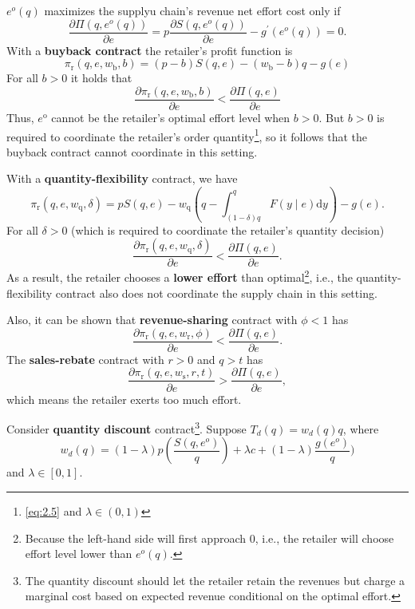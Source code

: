  $e^o(q)$ maximizes the supplyu chain's revenue net effort cost only if 
 \begin{equation}
     \frac{\partial\Pi(q,e^o(q))}{\partial e}=p\frac{\partial S(q,e^o(q))}{\partial e}-g^\prime(e^o(q))=0.
 \end{equation}
 With a \textbf{buyback contract} the retailer's profit function is
 $$
 \pi_{\mathrm{r}}\left(q, e, w_{\mathrm{b}}, b\right)=(p-b) S(q, e)-\left(w_{\mathrm{b}}-b\right) q-g(e)
 $$
 For all $b>0$ it holds that
 \begin{equation}
    \frac{\partial \pi_{\mathrm{r}}\left(q, e, w_{\mathrm{b}}, b\right)}{\partial e}<\frac{\partial \Pi(q, e)}{\partial e}
 \end{equation}
 Thus, $e^{\mathrm{o}}$ cannot be the retailer's optimal effort level when $b>0$. But $b>0$ is required to coordinate the retailer's order quantity\footnote{\autoref{eq:2.5} and $\lambda\in(0,1)$}, so it follows that the buyback contract cannot coordinate in this setting.

With a \textbf{quantity-flexibility} contract, we have 
$$
\pi_{\mathrm{r}}\left(q, e, w_{\mathrm{q}}, \delta\right)=p S(q, e)-w_{\mathrm{q}}\left(q-\int_{(1-\delta) q}^{q} F(y \mid e) \mathrm{d} y\right)-g(e) .
$$
For all $\delta>0$ (which is required to coordinate the retailer's quantity decision)
$$
\frac{\partial \pi_{\mathrm{r}}\left(q, e, w_{\mathrm{q}}, \delta\right)}{\partial e}<\frac{\partial \Pi(q, e)}{\partial e} .
$$
As a result, the retailer chooses a \textbf{lower effort} than optimal\footnote{Because the left-hand side will first approach $0$, i.e., the retailer will choose effort level lower than $e^o(q)$.}, i.e., the quantity-flexibility contract also does not coordinate the supply chain in this setting.

Also, it can be shown that \textbf{revenue-sharing} contract with $\phi<1$ has
$$\frac{\partial \pi_{\mathrm{r}}\left(q, e, w_{\mathrm{r}}, \phi\right)}{\partial e}<\frac{\partial \Pi(q, e)}{\partial e} .$$ The \textbf{sales-rebate} contract with $r>0$ and $q>t$ has
$$\frac{\partial \pi_{\mathrm{r}}\left(q, e, w_{\mathrm{s}}, r,t\right)}{\partial e}>\frac{\partial \Pi(q, e)}{\partial e},$$
which means the retailer exerts too much effort.

Consider \textbf{quantity discount} contract\footnote{The quantity discount should let the retailer retain the revenues but charge a marginal cost based on expected revenue conditional on the optimal effort.}. 
Suppose $T_d(q)=w_d(q)q$, where 
\begin{equation*}
    w_d(q)=(1-\lambda)p\left(\frac{S(q,e^o)}{q}\right)+\lambda c+(1-\lambda)\frac{g(e^o)}{q})
\end{equation*}
and $\lambda\in[0,1]$. 

